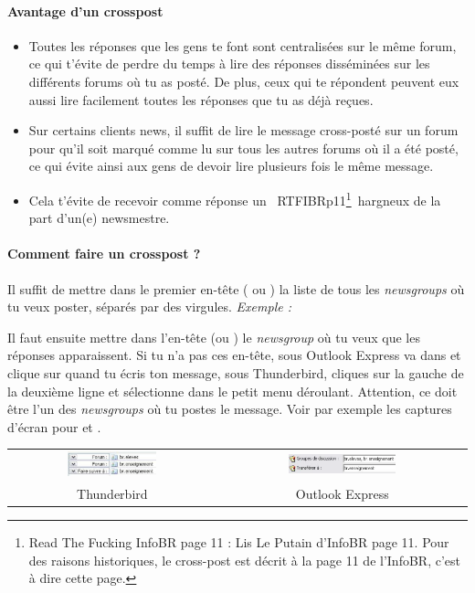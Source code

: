 \paragraph{Avantage d'un crosspost}
\begin{itemize}
 \item Toutes les réponses que les gens te font sont centralisées sur le même forum,
       ce qui t'évite de perdre du temps à lire des réponses disséminées
       sur les différents forums où tu as posté.
       De plus, ceux qui te répondent peuvent eux aussi lire facilement toutes les réponses
       que tu as déjà reçues.
 \item Sur certains clients news, il suffit de lire le message cross-posté sur un forum
       pour qu'il soit marqué comme lu sur tous les autres forums où il a été posté,
       ce qui évite ainsi aux gens de devoir lire plusieurs fois le même message.
 \item Cela t'évite de recevoir comme réponse un \guillemotleft~RTFIBRp11\footnote{Read The Fucking InfoBR page 11 :
       Lis Le Putain d'InfoBR page 11. Pour des raisons historiques, le cross-post est décrit à la page 11
       de l'InfoBR, c'est à dire cette page.}~\guillemotright  hargneux de la part d'un(e) newsmestre.
\end{itemize}

\paragraph{Comment faire un crosspost ?}
Il suffit de mettre dans le premier en-tête ( ou ) la liste de tous les \emph{newsgroups} où tu veux
poster, séparés par des virgules. \emph{Exemple :} 

Il faut ensuite mettre dans l'en-tête  (ou ) le \emph{newsgroup} où tu veux que les réponses apparaissent. Si
tu n'a pas ces en-tête, sous Outlook Express va dans  et clique sur  quand tu écris ton message, sous
Thunderbird, cliques sur la gauche de la deuxième ligne et sélectionne  dans le petit menu déroulant. Attention, ce doit être
l'un des \emph{newsgroups} où tu postes le message.
Voir par exemple les captures d'écran pour  et .\\

\noindent\begin{tabular}{cc}
\includegraphics[width=0.45\textwidth]{images/cross_post_TB}
     & \includegraphics[width=0.45\textwidth]{images/cross_post_OE} \\
Thunderbird & Outlook Express
\end{tabular}


